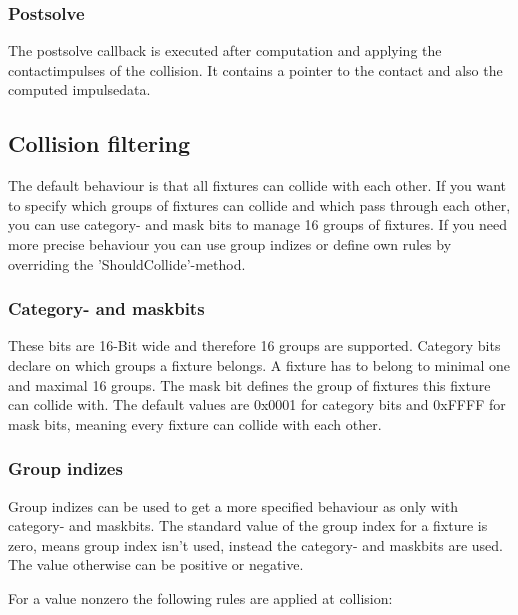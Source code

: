 \documentclass[10pt,a4paper,DIV=11]{scrreprt}
\begin{document}
\subsubsection*{Postsolve}
The postsolve callback is executed after computation and applying the contactimpulses of the collision. It contains a pointer to the contact and also the computed impulsedata.

\subsection{Collision filtering}
The default behaviour is that all fixtures can collide with each other. If you want to specify which groups of fixtures can collide and which pass through each other, you can use category- and mask bits to manage 16 groups of fixtures. If you need more precise behaviour you can use group indizes or define own rules by overriding the 'ShouldCollide'-method.

\subsubsection*{Category- and maskbits}

These bits are 16-Bit wide and therefore 16 groups are supported.
Category bits declare on which groups a fixture belongs. A fixture has to belong to minimal one and maximal 16 groups.
The mask bit defines the group of fixtures this fixture can collide with. The default values are 0x0001 for category bits and 0xFFFF for mask bits, meaning every fixture can collide with each other.

\subsubsection*{Group indizes}
Group indizes can be used to get a more specified behaviour as only with category- and maskbits.
The standard value of the group index for a fixture is zero, means group index isn't used, instead the category- and maskbits are used. The value otherwise can be positive or negative.

For a value nonzero the following rules are applied at collision: \\

   \\
\\
\end{document}
